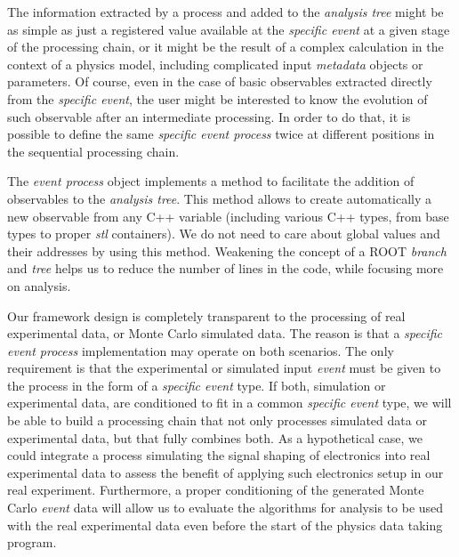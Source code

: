 The information extracted by a process and added to the \emph{analysis tree} might be as simple as just a registered value available at the \emph{specific event} at a given stage of the processing chain, or it might be the result of a complex calculation in the context of a physics model, including complicated input \emph{metadata} objects or parameters. Of course, even in the case of basic observables extracted directly from the \emph{specific event}, the user might be interested to know the evolution of such observable after an intermediate processing. In order to do that, it is possible to define the same \emph{specific event process} twice at different positions in the sequential processing chain.





The \emph{event process} object implements a method to facilitate the addition of observables to the \emph{analysis tree}. This method allows to create automatically a new observable from any C++ variable (including various C++ types, from base types to proper \emph{stl} containers). We do not need to care about global values and their addresses by using this method. Weakening the concept of a ROOT \emph{branch} and \emph{tree} helps us to reduce the number of lines in the code, while focusing more on analysis.

Our framework design is completely transparent to the processing of real experimental data, or Monte Carlo simulated data. The reason is that a \emph{specific event process} implementation may operate on both scenarios. The only requirement is that the experimental or simulated input \emph{event} must be given to the process in the form of a \emph{specific event} type. If both, simulation or experimental data, are conditioned to fit in a common \emph{specific event} type, we will be able to build a processing chain that not only processes simulated data or experimental data, but that fully combines both. As a hypothetical case, we could integrate a process simulating the signal shaping of electronics into real experimental data to assess the benefit of applying such electronics setup in our real experiment. Furthermore, a proper conditioning of the generated Monte Carlo \emph{event} data will allow us to evaluate the algorithms for analysis to be used with the real experimental data even before the start of the physics data taking program.


